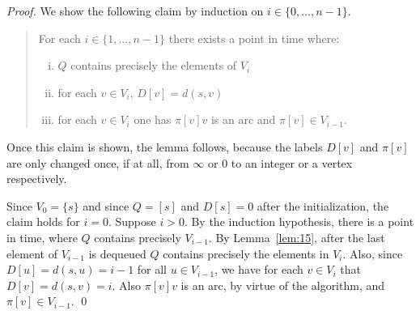 \begin{proof}  
  We show the following claim by induction on $i \in \{0,\ldots,n-1\}$. 
  \begin{quote}
    For each $i \in \{1,\ldots,n-1\}$ there exists a point in time where:
    \begin{enumerate}[i)]
    \item     $Q$ contains precisely  the elements  of $V_i$
      \label{item:1}
    \item for each $v \in V_i$,  $D[v] = d(s,v)$ \label{item:2}
    \item for each $v \in V_i$  one has   $\pi[v]v$
      is an arc and $\pi[v] \in V_{i-1}$. 
    \end{enumerate}
  \end{quote}
Once this claim is shown, the lemma follows, because the labels $D[v]$
and $\pi[v]$ are only changed once, if at all, from $\infty$ or $0$ 
to an integer
or a vertex respectively. 

Since $V_0 = \{s\}$ and since  $Q = [s]$ and $D[s] = 0$ after the initialization, the
claim holds for $ i = 0$. Suppose $i>0$. By the induction hypothesis,
there is a point in time, where  $Q$ contains precisely $V_{i-1}$. By
Lemma~\ref{lem:15}, after the last element of $V_{i-1}$ is dequeued
$Q$ contains precisely the elements in $V_i$. Also, since $D[u] =
d(s,u) = i-1$ for all $u \in V_{i-1}$, we have for each $v \in V_i$ that  $D[v]
= d(s,v)=i$. Also $\pi[v]v$ is an arc, by virtue of the algorithm, and
$\pi[v] \in V_{i-1}$.  \qed 
\end{proof}


  


